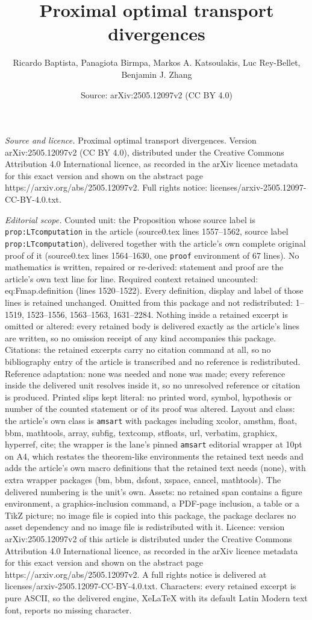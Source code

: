 \documentclass[10pt,a4paper]{amsart}
\title[Proximal optimal transport divergences]{Proximal optimal transport divergences}
\author{Ricardo Baptista, Panagiota Birmpa, Markos A. Katsoulakis, Luc Rey-Bellet, Benjamin J. Zhang}
\date{Source: arXiv:2505.12097v2 (CC BY 4.0)}
\begin{document}
\maketitle

\noindent\emph{Source and licence.} Proximal optimal transport divergences. Version arXiv:2505.12097v2 (CC BY 4.0), distributed under the Creative Commons Attribution 4.0 International licence, as recorded in the arXiv licence metadata for this exact version and shown on the abstract page https://arxiv.org/abs/2505.12097v2. Full rights notice: licenses/arxiv-2505.12097-CC-BY-4.0.txt.\par\smallskip

\noindent\textit{Editorial scope.} Counted unit: the Proposition whose source label is \texttt{prop:LTcomputation} in the article (source0.tex lines 1557--1562, source label \texttt{prop:LTcomputation}), delivered together with the article's own complete original proof of it (source0.tex lines 1564--1630, one \texttt{proof} environment of 67 lines). No mathematics is written, repaired or re-derived: statement and proof are the article's own text line for line. Required context retained uncounted: eq:Fmap.definition (lines 1520--1522). Every definition, display and label of those lines is retained unchanged. Omitted from this package and not redistributed: 1--1519, 1523--1556, 1563--1563, 1631--2284. Nothing inside a retained excerpt is omitted or altered: every retained body is delivered exactly as the article's lines are written, so no omission receipt of any kind accompanies this package. Citations: the retained excerpts carry no citation command at all, so no bibliography entry of the article is transcribed and no reference is redistributed. Reference adaptation: none was needed and none was made; every reference inside the delivered unit resolves inside it, so no unresolved reference or citation is produced. Printed slips kept literal: no printed word, symbol, hypothesis or number of the counted statement or of its proof was altered. Layout and class: the article's own class is \texttt{amsart} with packages including xcolor, amsthm, float, bbm, mathtools, array, subfig, textcomp, stfloats, url, verbatim, graphicx, hyperref, cite; the wrapper is the lane's pinned \texttt{amsart} editorial wrapper at 10pt on A4, which restates the theorem-like environments the retained text needs and adds the article's own macro definitions that the retained text needs (none), with extra wrapper packages (bm, bbm, dsfont, xspace, cancel, mathtools). The delivered numbering is the unit's own. Assets: no retained span contains a figure environment, a graphics-inclusion command, a PDF-page inclusion, a table or a TikZ picture; no image file is copied into this package, the package declares no asset dependency and no image file is redistributed with it. Licence: version arXiv:2505.12097v2 of this article is distributed under the Creative Commons Attribution 4.0 International licence, as recorded in the arXiv licence metadata for this exact version and shown on the abstract page https://arxiv.org/abs/2505.12097v2. A full rights notice is delivered at licenses/arxiv-2505.12097-CC-BY-4.0.txt. Characters: every retained excerpt is pure ASCII, so the delivered engine, XeLaTeX with its default Latin Modern text font, reports no missing character.
\end{document}

